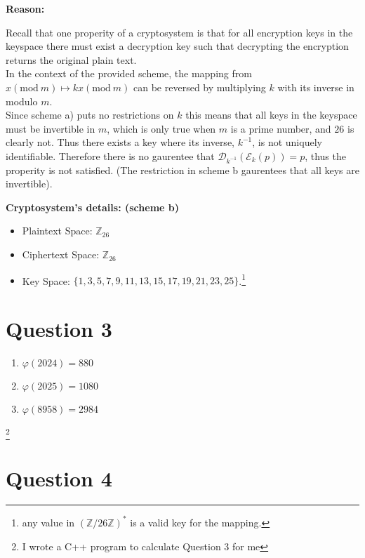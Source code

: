 \documentclass{article}
\makeatletter
\newcommand*{\currentname}{\TR@currentTitle}
\numberwithin{equation}{subsection}
\makeatother
\begin{document}
	\vspace{10pt}
	\textbf{Reason:}
	
	Recall that one properity of a cryptosystem is that for all encryption keys in the keyspace there must exist a decryption key
	such that decrypting the encryption returns the original plain text.\\
	In the context of the provided scheme, the mapping from $x (\textrm{mod}\ m)\mapsto kx (\textrm{mod}\ m)$ can be reversed
	by multiplying $k$ with its inverse in modulo $m$.\\ 
	Since scheme a) puts no restrictions on $k$ this means that all keys in the keyspace must be invertible in $m$, which is only true
	when $m$ is a prime number, and $26$ is clearly not. Thus there exists a key where its inverse, $k^{-1}$, is not uniquely identifiable.
	Therefore there is no gaurentee that $\mathcal{D}_{k^{-1}} (\mathcal{E}_k(p)) = p$, thus the properity is not satisfied. (The restriction in scheme b gaurentees
	that all keys are invertible).

	\textbf{Cryptosystem's details: (scheme b)}
	\begin{itemize}
		\item Plaintext Space: $\mathbb{Z}_{26}$
		\item Ciphertext Space: $\mathbb{Z}_{26}$
		\item Key Space: $\{1,3,5,7,9,11,13,15,17,19,21,23,25\}$.\quad \footnote{any value in $(\mathbb{Z}/26\mathbb{Z})^*$ is a valid key for the
			mapping.}
	\end{itemize}	


	\thispagestyle{fancy}

	\vspace{25pt}
	\section*{Question 3 }	
	\begin{enumerate}
		\item $\varphi(2024) = 880$
		\item $\varphi(2025) = 1080$
		\item $\varphi(8958) = 2984$
	\end{enumerate}
	\footnote{I wrote a C++ program to calculate Question 3 for me}

	\newpage
	\section*{Question 4}
	
\end{document}
